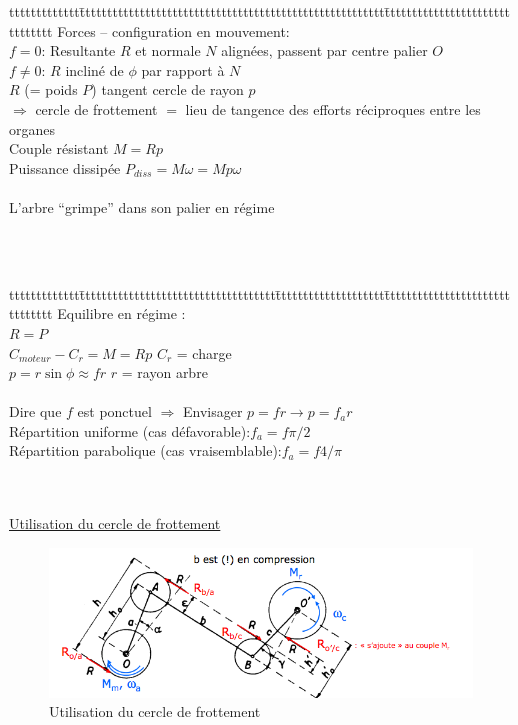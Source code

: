 \begin{orangebox}
\begin{tabbing}
ttttttttttttt\=tttttttttttttttttttttttttttttttttttttttttttttttttttttttt\=ttttttttttttttttttttttttttttttt\kill
Forces – configuration en mouvement:\\
$f = 0$: \> Resultante $R$ et normale $N$ alignées, passent par centre palier $O$\\
$f \neq 0$:\> $R$ incliné de $\phi$ par rapport à $N$\\
\> $R$ (= poids $P$) tangent cercle de rayon $p$ \\
\> $\Rightarrow$ {\color{orange}cercle de frottement} $=$ lieu de tangence des efforts réciproques entre les organes\\
\> Couple résistant $M=Rp$\\
\> Puissance dissipée $P_{diss} = M\omega=Mp\omega$\\\\
L'arbre “grimpe” dans son palier en régime
\end{tabbing}
\end{orangebox}\\\\

\begin{bluebox}
\begin{tabbing}
ttttttttttttt\=tttttttttttttttttttttttttttttttttttt\=tttttttttttttttttttt\=ttttttttttttttttttttttttttttttt\kill
Equilibre en régime :\\
\>$R=P$\\
\>$C_{moteur}-C_r=M=Rp$\> $C_r$ = charge\\
\>$p=r\sin\phi\approx fr$\> $r$ = rayon arbre\\\\
Dire que $f$ est ponctuel $\Rightarrow$\> \>Envisager $p=fr \rightarrow p=f_ar$\\
\>Répartition uniforme (cas défavorable):\>\>$f_a=f\pi/2$\\
\>Répartition parabolique (cas vraisemblable):\>\>$f_a=f4/\pi$
\end{tabbing}
\end{bluebox}\\\\

\underline{Utilisation du cercle de frottement}\\

\begin{figure}[H]
\centering
\includegraphics[width=\linewidth]{cerclef.png}
\caption{Utilisation du cercle de frottement}
\label{cerclef}
\end{figure}

